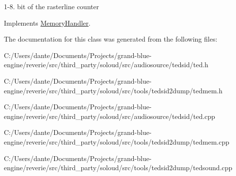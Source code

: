 1-\/8. bit of the rasterline counter 

Implements \mbox{\hyperlink{class_memory_handler}{Memory\+Handler}}.



The documentation for this class was generated from the following files\+:\begin{DoxyCompactItemize}
\item 
C\+:/\+Users/dante/\+Documents/\+Projects/grand-\/blue-\/engine/reverie/src/third\+\_\+party/soloud/src/audiosource/tedsid/ted.\+h\item 
C\+:/\+Users/dante/\+Documents/\+Projects/grand-\/blue-\/engine/reverie/src/third\+\_\+party/soloud/src/tools/tedsid2dump/tedmem.\+h\item 
C\+:/\+Users/dante/\+Documents/\+Projects/grand-\/blue-\/engine/reverie/src/third\+\_\+party/soloud/src/audiosource/tedsid/ted.\+cpp\item 
C\+:/\+Users/dante/\+Documents/\+Projects/grand-\/blue-\/engine/reverie/src/third\+\_\+party/soloud/src/tools/tedsid2dump/tedmem.\+cpp\item 
C\+:/\+Users/dante/\+Documents/\+Projects/grand-\/blue-\/engine/reverie/src/third\+\_\+party/soloud/src/tools/tedsid2dump/tedsound.\+cpp\end{DoxyCompactItemize}
